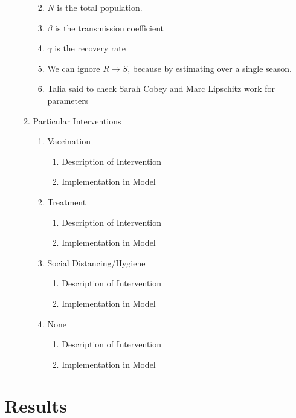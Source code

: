 \documentclass{article}
\begin{document}
\begin{enumerate}
\begin{enumerate}
\begin{enumerate}
			\item $N$ is the total population.
			\item $\beta$ is the transmission coefficient
			\item $\gamma$ is the recovery rate
			\item We can ignore $R\rightarrow S$, because by estimating over a single season.
			\item Talia said to check Sarah Cobey and Marc Lipschitz work for parameters
		\end{enumerate}
		\item Particular Interventions
		\begin{enumerate}
			\item Vaccination
			\begin{enumerate}
				\item Description of Intervention
				\item Implementation in Model
			\end{enumerate}
			\item Treatment
			\begin{enumerate}
				\item Description of Intervention
				\item Implementation in Model
			\end{enumerate}
			\item Social Distancing/Hygiene
			\begin{enumerate}
				\item Description of Intervention
				\item Implementation in Model
			\end{enumerate}
			\item None
			\begin{enumerate}
				\item Description of Intervention
				\item Implementation in Model
			\end{enumerate}
		\end{enumerate}
	\end{enumerate}
\end{enumerate}
\section{Results}
\end{document}
